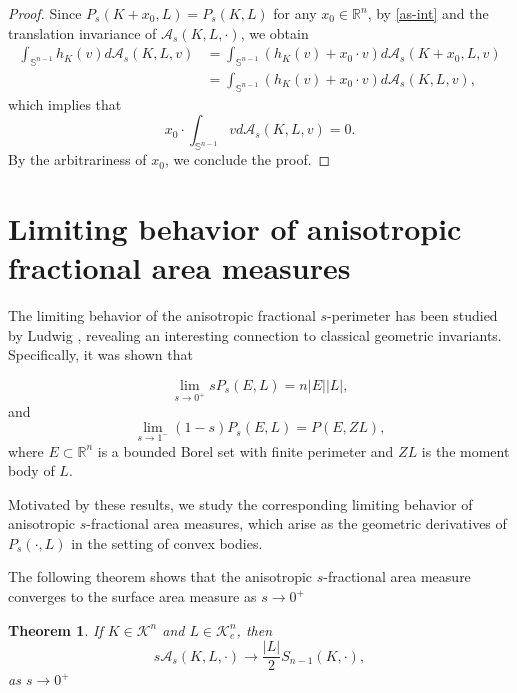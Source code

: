 \documentclass[12pt, oneside,reqno]{amsart}
\numberwithin{equation}{section}
\newtheorem{theorem}{Theorem}[section]
\newtheorem{corollary}[theorem]{Corollary}
\newtheorem{definition and theorem}[theorem]{Definition and Theorem}
\newcommand{\tA}{\mathcal{A}_s}
\theoremstyle{plain}
\theoremstyle{remark}
\theoremstyle{definition}
\newcommand{\sn}{{\mathbb S}^{n-1}}
\newcommand{\rn}{\mathbb R^n}
\newcommand{\tk}{\mathcal{K}}
\begin{document}
\begin{proof}
   Since $P_s(K+x_0,L)=P_s(K,L)$ for any $x_0\in\rn$, by \eqref{as-int} and the translation invariance of $\tA(K,L,\cdot)$, we obtain
   \begin{align*}
   \int_{\sn}h_K(v) d\tA(K,L,v)&=\int_{\sn}(h_K(v)+ x_0\cdot v)d\tA(K+x_0,L,v)\\&=\int_{\sn}(h_K(v)+ x_0\cdot v)d\tA(K,L,v),
   \end{align*}
   which implies that
   \[x_0\cdot\int_{\sn} v  d\tA(K,L,v)=0.\]
   By the arbitrariness of $x_0$, we conclude the proof.
\end{proof}




\section{Limiting behavior of anisotropic fractional area measures}

The limiting behavior of the anisotropic fractional $s$-perimeter has been studied by Ludwig \cite{Lud1}, revealing an interesting connection to classical geometric invariants. Specifically, it was shown that

\[\lim_{s\rightarrow 0^+}sP_s(E,L)=n|E||L|,\]
and
\[\lim_{s\rightarrow 1^-}(1-s)P_s(E,L)=P(E,ZL),\]
where $E\subset\rn$ is a bounded Borel set with finite perimeter and $ZL$ is the moment body of $L$.

Motivated by these results, we study the corresponding limiting behavior of anisotropic $s$-fractional area measures, which arise as the geometric derivatives of $P_s(\cdot, L)$ in the setting of convex bodies.

The following theorem shows that  the anisotropic $s$-fractional area measure converges to the surface area measure as $s\rightarrow 0^+$

\begin{theorem}
    If $K\in\tk^n$ and $L\in\tk_e^n$, then
    \[s\tA(K,L,\cdot)\rightarrow \frac{|L|}{2}S_{n-1}(K,\cdot),\]
    as $s\rightarrow 0^+$
\end{theorem}
\end{document}
